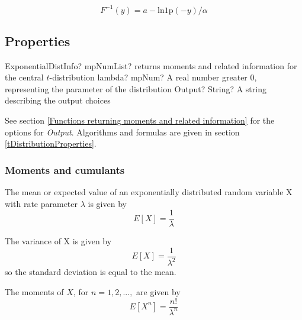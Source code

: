 \vspace{0.3cm}
\begin{equation} 
	F^{-1}(y)=a- \text{ln1p}(-y)/\alpha
\end{equation}



\subsection{Properties}
\label{ExponentialDistributionProperties}


\begin{mpFunctionsExtract}
	\mpFunctionTwo
	{ExponentialDistInfo? mpNumList? returns moments and related information for the central $t$-distribution}
	{lambda? mpNum? A real number greater 0, representing the parameter of the distribution}
	{Output? String? A string describing the output choices}
\end{mpFunctionsExtract}

\vspace{0.3cm}

See section \ref{Functions returning moments and related information} for the options for {\itshape\sffamily Output}. Algorithms and formulas are given in section \ref{tDistributionProperties}.




\subsubsection{Moments and cumulants}
The mean or expected value of an exponentially distributed random variable X with rate parameter $\lambda$ is given by
\begin{equation} 
	E[X]=\frac{1}{\lambda}
\end{equation}

The variance of X is given by
\begin{equation} 
	E[X]=\frac{1}{\lambda^2}
\end{equation}
so the standard deviation is equal to the mean.

The moments of $X$, for $n = 1, 2, ...,$ are given by
\begin{equation} 
	E[X^n]=\frac{n!}{\lambda^n}
\end{equation}



%
%
%
%

